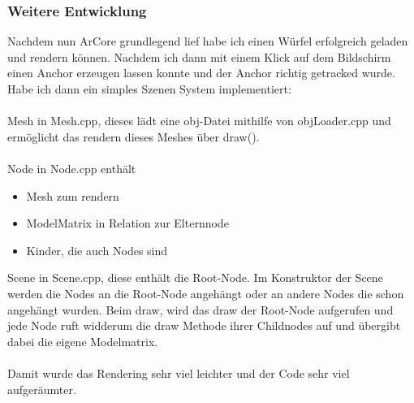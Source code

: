 \subsubsection{Weitere Entwicklung}
Nachdem nun ArCore grundlegend lief habe ich einen Würfel erfolgreich geladen und rendern können.
Nachdem ich dann mit einem Klick auf dem Bildschirm einen
Anchor erzeugen lassen konnte und der Anchor richtig getracked wurde.
Habe ich dann ein simples Szenen System implementiert:
\\ \\
Mesh in Mesh.cpp, dieses lädt eine obj-Datei mithilfe von objLoader.cpp und ermöglicht das rendern dieses Meshes über draw().
\\ \\
Node in Node.cpp enthält
\begin{itemize}
  \item Mesh zum rendern
  \item ModelMatrix in Relation zur Elternnode
  \item Kinder, die auch Nodes sind
\end{itemize}
Scene in Scene.cpp, diese enthält die Root-Node.
Im Konstruktor der Scene werden die Nodes an die Root-Node angehängt oder an andere Nodes die schon angehängt wurden. Beim draw, wird das draw der Root-Node aufgerufen und jede Node ruft widderum
die draw Methode ihrer Childnodes auf und übergibt dabei die eigene Modelmatrix.
\\ \\
Damit wurde das Rendering sehr viel leichter und der Code sehr viel aufgeräumter.

